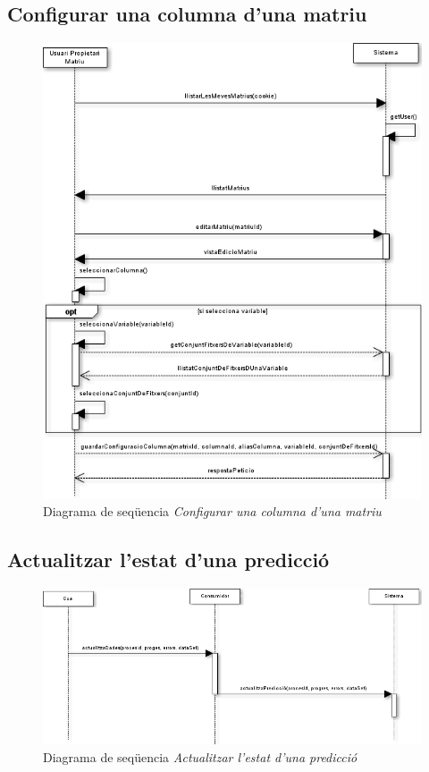 \subsection*{Configurar una columna d'una matriu}
\begin{figure}[H]
  \centering
  \includegraphics[scale=0.6]{img/specification/SequenceConfigureColumn.png}
  \caption{Diagrama de seqüencia \textit{Configurar una columna d'una matriu} }
  \label{fig:sequenceconfigurecolumn}
\end{figure}

\subsection*{Actualitzar l'estat d'una predicci\'{o}}
\begin{figure}[H]
  \centering
  \includegraphics[scale=0.6]{img/specification/SequenceUpdatePrediccio.png}
  \caption{Diagrama de seqüencia \textit{Actualitzar l'estat d'una predicci\'{o}} }
  \label{fig:sequenceupdateprediccio}
\end{figure}
